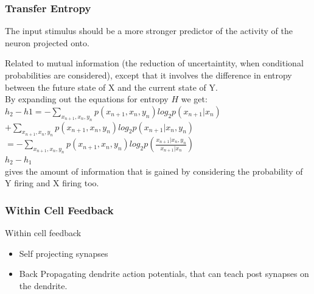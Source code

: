 \documentclass{beamer}
\begin{document}
\begin{frame}
\frametitle{Transfer Entropy}

The input stimulus should be a more stronger predictor of the activity of the neuron projected onto.


Related to mutual information (the reduction of uncertaintity, when conditional probabilities are considered), except that it involves the difference in entropy between the future state of X and the current state of Y.\\ 

By expanding out the equations for entropy $ H $ we get:\\
\vfill \center $h_{2}-h{1}=-\sum_{x_{n+1},x_{n},y_{n}}p(x_{n+1},x_{n},y_{n})log_{2}p(x_{n+1}|x_{n})$ \\
\center $+ \sum_{x_{n+1},x_{n},y_{n}}p(x_{n+1},x_{n},y_{n})log_{2}p(x_{n+1}|x_{n},y_{n})$\\

\vfill
\center 	$=-\sum_{x_{n+1},x_{n},y_{n}}p(x_{n+1},x_{n},y_{n})log_{2}p(\frac{x_{n+1}|x_{n},y_{n}}{x_{n+1}|x_{n}})$\\
$h_{2}-h_{1}$ \\gives the amount of information that is gained by considering the probability of Y firing and X firing too.
\end{frame}



\begin{frame}
\frametitle{Within Cell Feedback}
Within cell feedback
\begin{itemize}
\vfill \item Self projecting synapses
\vfill \item Back Propagating dendrite action potentials, that can teach post synapses on the dendrite.
\end{itemize}
\end{frame}
\end{document}
